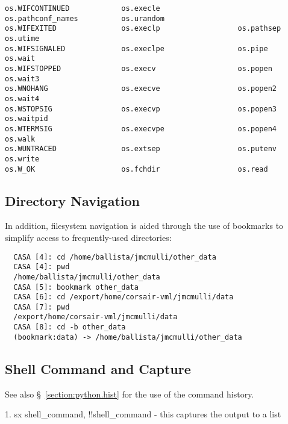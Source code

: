 \begin{verbatim}
os.WIFCONTINUED            os.execle                  os.pathconf_names          os.urandom
os.WIFEXITED               os.execlp                  os.pathsep                 os.utime
os.WIFSIGNALED             os.execlpe                 os.pipe                    os.wait
os.WIFSTOPPED              os.execv                   os.popen                   os.wait3
os.WNOHANG                 os.execve                  os.popen2                  os.wait4
os.WSTOPSIG                os.execvp                  os.popen3                  os.waitpid
os.WTERMSIG                os.execvpe                 os.popen4                  os.walk
os.WUNTRACED               os.extsep                  os.putenv                  os.write
os.W_OK                    os.fchdir                  os.read                    
\end{verbatim}
\normalsize

\subsection{Directory Navigation}
\label{section:python.sys.navi}

In addition, filesystem navigation is aided through the use of
bookmarks to simplify access to frequently-used directories: 
\small
\begin{verbatim}
  CASA [4]: cd /home/ballista/jmcmulli/other_data
  CASA [4]: pwd
  /home/ballista/jmcmulli/other_data
  CASA [5]: bookmark other_data
  CASA [6]: cd /export/home/corsair-vml/jmcmulli/data
  CASA [7]: pwd
  /export/home/corsair-vml/jmcmulli/data
  CASA [8]: cd -b other_data
  (bookmark:data) -> /home/ballista/jmcmulli/other_data
\end{verbatim}
\normalsize

\subsection{Shell Command and Capture}
\label{section:python.sys.capture}

See also \S~\ref{section:python.hist} for the use of the command
history.

1. sx shell\_command, !!shell\_command - this captures the output to a list 

